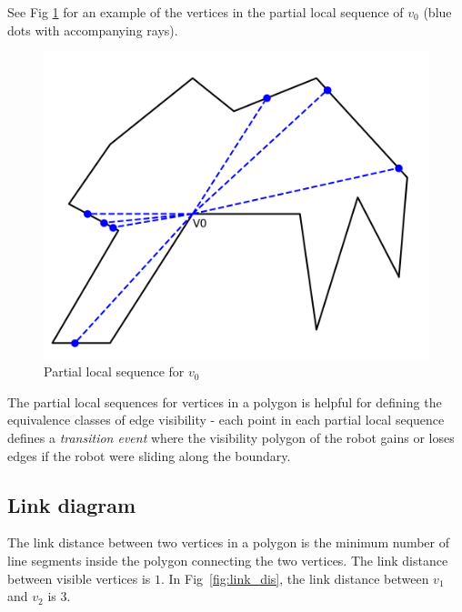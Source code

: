 \documentclass[letterpaper, 10 pt, conference]{ieeeconf}  %
\begin{document}
See Fig \ref{fig:pls} for an example of the vertices in the partial local
sequence of $v_0$ (blue dots with accompanying rays).

\begin{figure}[h]
    \includegraphics[width=0.8\linewidth]{images/partial_local_sequence.png}
    \caption{Partial local sequence for $v_0$}\label{fig:pls}
    \centering
\end{figure}

The partial local sequences for vertices in a polygon is helpful for defining
the equivalence classes of edge visibility - each point in each partial local
sequence defines a \emph{transition event} where the visibility polygon of the
robot gains or loses edges if the robot were sliding along the boundary.



\subsection{Link diagram}

The link distance between two vertices in a polygon is the minimum number of line segments inside the polygon connecting the two vertices. The link distance between visible vertices is $1$. In Fig~\ref{fig:link_dis}, the link distance between $v_1$ and $v_2$ is 3.
\end{document}
